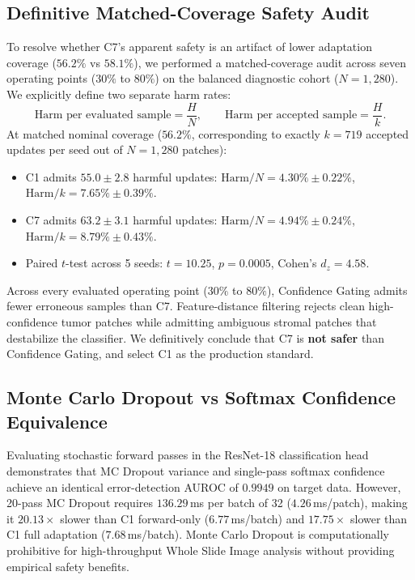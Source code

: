 \documentclass[conference]{IEEEtran}
\begin{document}
\subsection{Definitive Matched-Coverage Safety Audit}
To resolve whether C7's apparent safety is an artifact of lower adaptation coverage ($56.2\%$ vs $58.1\%$), we performed a matched-coverage audit across seven operating points ($30\%$ to $80\%$) on the balanced diagnostic cohort ($N=1{,}280$). We explicitly define two separate harm rates:
\begin{equation}
    \text{Harm per evaluated sample} = \frac{H}{N}, \qquad \text{Harm per accepted sample} = \frac{H}{k}.
\end{equation}
At matched nominal coverage ($56.2\%$, corresponding to exactly $k=719$ accepted updates per seed out of $N=1{,}280$ patches):
\begin{itemize}
    \item C1 admits $55.0 \pm 2.8$ harmful updates: $\text{Harm}/N = \mathbf{4.30\% \pm 0.22\%}$, $\text{Harm}/k = \mathbf{7.65\% \pm 0.39\%}$.
    \item C7 admits $63.2 \pm 3.1$ harmful updates: $\text{Harm}/N = \mathbf{4.94\% \pm 0.24\%}$, $\text{Harm}/k = \mathbf{8.79\% \pm 0.43\%}$.
    \item Paired $t$-test across 5 seeds: $t = 10.25$, $p = 0.0005$, Cohen's $d_z = 4.58$.
\end{itemize}
Across every evaluated operating point ($30\%$ to $80\%$), Confidence Gating admits fewer erroneous samples than C7. Feature-distance filtering rejects clean high-confidence tumor patches while admitting ambiguous stromal patches that destabilize the classifier. We definitively conclude that C7 is \textbf{not safer} than Confidence Gating, and select C1 as the production standard.

\subsection{Monte Carlo Dropout vs Softmax Confidence Equivalence}
Evaluating stochastic forward passes in the ResNet-18 classification head demonstrates that MC Dropout variance and single-pass softmax confidence achieve an identical error-detection AUROC of $0.9949$ on target data. However, 20-pass MC Dropout requires $136.29$\,ms per batch of 32 ($4.26$\,ms/patch), making it $20.13\times$ slower than C1 forward-only ($6.77$\,ms/batch) and $17.75\times$ slower than C1 full adaptation ($7.68$\,ms/batch). Monte Carlo Dropout is computationally prohibitive for high-throughput Whole Slide Image analysis without providing empirical safety benefits.
\end{document}
